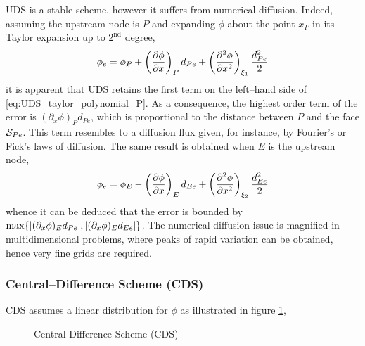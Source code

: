 UDS is a stable scheme, however it suffers from numerical diffusion. Indeed, assuming the upstream node is $P$ and expanding $\phi$ about the point $x_P$ in its Taylor expansion up to $2^\text{nd}$ degree,
\begin{equation} \label{eq:UDS_taylor_polynomial_P}
	\phi_e = 
	\phi_P + \left(\pdv{\phi}{x}\right)_P d_{Pe} + 
	\left(\pdv[2]{\phi}{x}\right)_{\xi_1} \frac{d_{Pe}^2}{2}
\end{equation}
it is apparent that UDS retains the first term on the left--hand side of \eqref{eq:UDS_taylor_polynomial_P}. As a consequence, the highest order term of the error is $(\partial_x \phi)_P d_{Pe}$, which is proportional to the distance between $P$ and the face $\mathcal{S}_{Pe}$. This term resembles to a diffusion flux given, for instance, by Fourier's or Fick's laws of diffusion. The same result is obtained when $E$ is the upstream node,
\begin{equation}
	\phi_e = 
	\phi_E - \left(\pdv{\phi}{x}\right)_E d_{Ee} + \left(\pdv[2]{\phi}{x}\right)_{\xi_2} \frac{d_{Ee}^2}{2}
\end{equation}
whence it can be deduced that the error is bounded by $\max\{ \abs{(\partial_x \phi)_E d_{Pe}}, \abs{(\partial_x \phi)_E d_{Ee}}\}$. The numerical diffusion issue is magnified in multidimensional problems, where peaks of rapid variation can be obtained, hence very fine grids are required. 

\subsubsection{Central--Difference Scheme (CDS)}

CDS assumes a linear distribution for $\phi$ as illustrated in figure \ref{fig:central_difference_scheme},
\begin{figure}[h]
	\centering
	\caption{Central Difference Scheme (CDS)}
	\label{fig:central_difference_scheme}
\end{figure}

